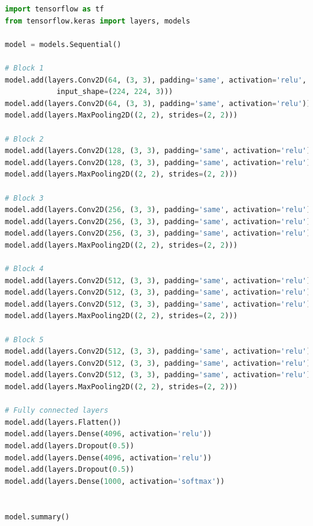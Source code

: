 \begin{lstlisting}[language=Python,caption=VGG-16 - tensorflow - Python]
import tensorflow as tf
from tensorflow.keras import layers, models

model = models.Sequential()

# Block 1
model.add(layers.Conv2D(64, (3, 3), padding='same', activation='relu', 
            input_shape=(224, 224, 3)))
model.add(layers.Conv2D(64, (3, 3), padding='same', activation='relu'))
model.add(layers.MaxPooling2D((2, 2), strides=(2, 2)))

# Block 2
model.add(layers.Conv2D(128, (3, 3), padding='same', activation='relu'))
model.add(layers.Conv2D(128, (3, 3), padding='same', activation='relu'))
model.add(layers.MaxPooling2D((2, 2), strides=(2, 2)))

# Block 3
model.add(layers.Conv2D(256, (3, 3), padding='same', activation='relu'))
model.add(layers.Conv2D(256, (3, 3), padding='same', activation='relu'))
model.add(layers.Conv2D(256, (3, 3), padding='same', activation='relu'))
model.add(layers.MaxPooling2D((2, 2), strides=(2, 2)))

# Block 4
model.add(layers.Conv2D(512, (3, 3), padding='same', activation='relu'))
model.add(layers.Conv2D(512, (3, 3), padding='same', activation='relu'))
model.add(layers.Conv2D(512, (3, 3), padding='same', activation='relu'))
model.add(layers.MaxPooling2D((2, 2), strides=(2, 2)))

# Block 5
model.add(layers.Conv2D(512, (3, 3), padding='same', activation='relu'))
model.add(layers.Conv2D(512, (3, 3), padding='same', activation='relu'))
model.add(layers.Conv2D(512, (3, 3), padding='same', activation='relu'))
model.add(layers.MaxPooling2D((2, 2), strides=(2, 2)))

# Fully connected layers
model.add(layers.Flatten())
model.add(layers.Dense(4096, activation='relu'))
model.add(layers.Dropout(0.5))
model.add(layers.Dense(4096, activation='relu'))
model.add(layers.Dropout(0.5))
model.add(layers.Dense(1000, activation='softmax'))


model.summary()
\end{lstlisting}

